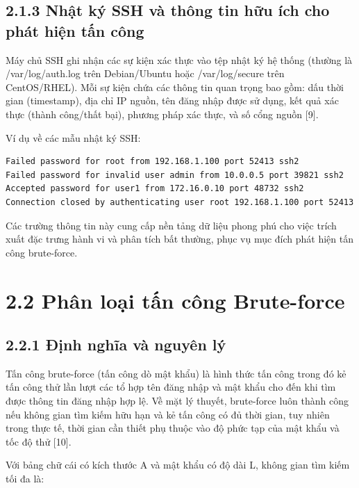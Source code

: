 \documentclass[
  a4paper]{report}
\begin{document}
\subsection{2.1.3 Nhật ký SSH và thông tin hữu ích cho phát hiện tấn
công}\label{nhux1eadt-kuxfd-ssh-vuxe0-thuxf4ng-tin-hux1eefu-uxedch-cho-phuxe1t-hiux1ec7n-tux1ea5n-cuxf4ng}

Máy chủ SSH ghi nhận các sự kiện xác thực vào tệp nhật ký hệ thống
(thường là /var/log/auth.log trên Debian/Ubuntu hoặc /var/log/secure
trên CentOS/RHEL). Mỗi sự kiện chứa các thông tin quan trọng bao gồm:
dấu thời gian (timestamp), địa chỉ IP nguồn, tên đăng nhập được sử dụng,
kết quả xác thực (thành công/thất bại), phương pháp xác thực, và số cổng
nguồn {[}9{]}.

Ví dụ về các mẫu nhật ký SSH:

\begin{verbatim}
Failed password for root from 192.168.1.100 port 52413 ssh2
Failed password for invalid user admin from 10.0.0.5 port 39821 ssh2
Accepted password for user1 from 172.16.0.10 port 48732 ssh2
Connection closed by authenticating user root 192.168.1.100 port 52413
\end{verbatim}

Các trường thông tin này cung cấp nền tảng dữ liệu phong phú cho việc
trích xuất đặc trưng hành vi và phân tích bất thường, phục vụ mục đích
phát hiện tấn công brute-force.

\section{2.2 Phân loại tấn công
Brute-force}\label{phuxe2n-loux1ea1i-tux1ea5n-cuxf4ng-brute-force}

\subsection{2.2.1 Định nghĩa và nguyên
lý}\label{ux111ux1ecbnh-nghux129a-vuxe0-nguyuxean-luxfd}

Tấn công brute-force (tấn công dò mật khẩu) là hình thức tấn công trong
đó kẻ tấn công thử lần lượt các tổ hợp tên đăng nhập và mật khẩu cho đến
khi tìm được thông tin đăng nhập hợp lệ. Về mặt lý thuyết, brute-force
luôn thành công nếu không gian tìm kiếm hữu hạn và kẻ tấn công có đủ
thời gian, tuy nhiên trong thực tế, thời gian cần thiết phụ thuộc vào độ
phức tạp của mật khẩu và tốc độ thử {[}10{]}.

Với bảng chữ cái có kích thước \textbar A\textbar{} và mật khẩu có độ
dài L, không gian tìm kiếm tối đa là:
\end{document}
